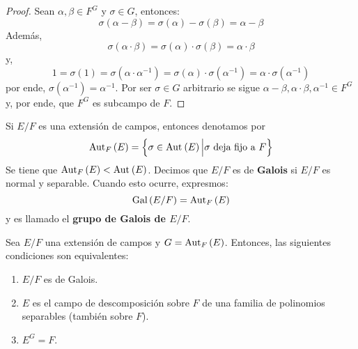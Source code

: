 \documentclass[12pt]{report}
\theoremstyle{largebreak}
\begin{document}
    \begin{proof}
        Sean $\alpha,\beta\in F^G$ y $\sigma\in G$, entonces:
        \begin{equation*}
            \sigma(\alpha-\beta)=\sigma(\alpha)-\sigma(\beta)=\alpha-\beta
        \end{equation*}
        Además, 
        \begin{equation*}
            \sigma(\alpha\cdot\beta)=\sigma(\alpha)\cdot\sigma(\beta)=\alpha\cdot\beta
        \end{equation*}
        y,
        \begin{equation*}
            1=\sigma(1)=\sigma(\alpha\cdot\alpha^{-1})=\sigma(\alpha)\cdot\sigma(\alpha^{-1})=\alpha\cdot\sigma(\alpha^{-1})
        \end{equation*}
        por ende, $\sigma(\alpha^{-1})=\alpha^{-1}$. Por ser $\sigma\in G$ arbitrario se sigue $\alpha-\beta,\alpha\cdot\beta,\alpha^{-1}\in F^G$ y, por ende, que $F^G$ es subcampo de $F$.
    \end{proof}

    \begin{mydef}
        Si $E/F$ es una extensión de campos, entonces denotamos por
        \begin{equation*}
            \textup{Aut}_{F}\left(E\right)=\left\{\sigma\in\textup{Aut}_{}\left(E\right)\Big|\sigma\textup{ deja fijo a }F \right\}
        \end{equation*}
        Se tiene que $\textup{Aut}_{F}\left(E\right)<\textup{Aut}_{}\left(E\right)$. Decimos que $E/F$ es de \textbf{Galois} si $E/F$ es normal y separable. Cuando esto ocurre, expresmos:
        \begin{equation*}
            \textup{Gal}\left(E/F\right)=\textup{Aut}_{F}\left(E\right)
        \end{equation*}
        y es llamado el \textbf{grupo de Galois de $E/F$}.
    \end{mydef}

    \begin{propo}
        Sea $E/F$ una extensión de campos y $G=\textup{Aut}_{F}\left(E\right)$. Entonces, las siguientes condiciones son equivalentes:
        \begin{enumerate}
            \item $E/F$ es de Galois.
            \item $E$ es el campo de descomposición sobre $F$ de una familia de polinomios separables (también sobre $F$).
            \item $E^G=F$.
        \end{enumerate}
    \end{propo}
\end{document}
